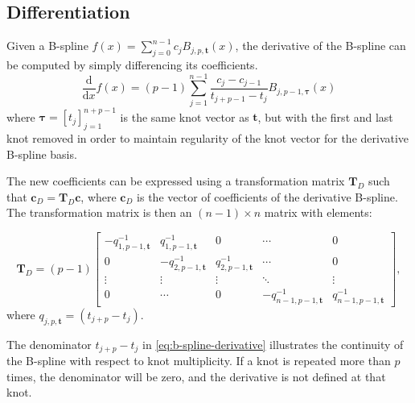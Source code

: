 \subsection{Differentiation}\label{sec:derivative}
Given a B-spline $f(x) = \sum_{j=0}^{n-1} c_j B_{j, p, \mathbf{t}}(x)$,
the derivative of the B-spline can be computed by simply differencing its coefficients. 
\begin{equation}\label{eq:b-spline-derivative}
    \frac{\mathrm d}{\mathrm dx} f(x) = (p-1) \sum_{j=1}^{n-1} \frac{c_j-c_{j-1}}{t_{j+p-1}-t_j} B_{j, p-1, \boldsymbol{\tau}}(x)
\end{equation}
where $\boldsymbol{\tau} = [t_j]_{j=1}^{n+p-1}$ is the same knot vector as $\mathbf{t}$, but with the first and last knot removed in order to maintain regularity of the knot vector for the derivative B-spline basis.

The new coefficients can be expressed using a transformation matrix $\mathbf T_D$ such that $\mathbf{c}_D = \mathbf T_D \mathbf{c}$, where $\mathbf{c}_D$ is the vector of coefficients of the derivative B-spline. The transformation matrix is then an $(n-1) \times n$ matrix with elements:

\begin{equation}
    \mathbf T_D = (p-1) \begin{bmatrix}
        -q_{1,p-1,\mathbf{t}}^{-1} & q_{1,p-1,\mathbf{t}}^{-1} & 0 & \cdots & 0 \\
        0 & -q_{2,p-1,\mathbf{t}}^{-1} & q_{2,p-1,\mathbf{t}}^{-1} & \cdots & 0 \\
        \vdots & \vdots & \vdots & \ddots & \vdots \\
        0 & \cdots & 0 & -q_{n-1,p-1,\mathbf{t}}^{-1} & q_{n-1,p-1,\mathbf{t}}^{-1} 
    \end{bmatrix},
\end{equation}
where $q_{j,p,\mathbf{t}} = (t_{j+p}-t_j)$.


The denominator $t_{j+p}-t_j$ in \cref{eq:b-spline-derivative} illustrates the continuity of the B-spline with respect to knot multiplicity. If a knot is repeated more than $p$ times, the denominator will be zero, and the derivative is not defined at that knot.

